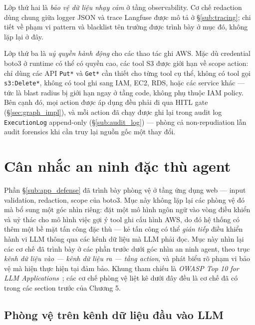 Lớp thứ hai là \emph{bảo vệ dữ liệu nhạy cảm} ở tầng observability. Cơ chế redaction dùng chung giữa logger JSON và trace Langfuse được mô tả ở \S\ref{sub:tracing}; chi tiết về phạm vi pattern và blacklist tên trường được trình bày ở mục đó, không lặp lại ở đây.

Lớp thứ ba là \emph{uỷ quyền hành động} cho các thao tác ghi AWS. Mặc dù credential boto3 ở runtime có thể có quyền cao, các tool S3 được giới hạn về scope action: chỉ dùng các API \texttt{Put*} và \texttt{Get*} cần thiết cho từng tool cụ thể, không có tool gọi \texttt{s3:Delete*}, không có tool ghi sang IAM, EC2, RDS, hoặc các service khác — tức là blast radius bị giới hạn ngay ở tầng code, không phụ thuộc IAM policy. Bên cạnh đó, mọi action được áp dụng đều phải đi qua HITL gate (\S\ref{sec:graph_impl}), và mỗi action đã chạy được ghi lại trong audit log \texttt{ExecutionLog} append-only (\S\ref{sub:audit_log}) — phòng cả non-repudiation lẫn audit forensics khi cần truy lại nguồn gốc một thay đổi.



\section{Cân nhắc an ninh đặc thù agent}
\label{sec:agent_threat_model}

Phần \S\ref{sub:app_defense} đã trình bày phòng vệ ở tầng ứng dụng web --- input validation, redaction, scope của boto3. Mục này không lặp lại các phòng vệ đó mà bổ sung một góc nhìn riêng: \sysname{} đặt một mô hình ngôn ngữ vào vòng điều khiển và uỷ thác cho mô hình việc gợi ý tool ghi cấu hình AWS, do đó hệ thống có thêm một bề mặt tấn công đặc thù --- kẻ tấn công có thể \textit{gián tiếp} điều khiển hành vi LLM thông qua các kênh dữ liệu mà LLM phải đọc. Mục này nhìn lại các cơ chế đã trình bày ở các phần trước dưới góc nhìn an ninh agent, theo trục \emph{kênh dữ liệu vào --- kênh dữ liệu ra --- tầng action}, và phát biểu rõ phạm vi bảo vệ mà hiện thực hiện tại đảm bảo. Khung tham chiếu là \textit{OWASP Top 10 for LLM Applications}~\cite{owasp_llm_top10_2025}; các cơ chế phòng vệ liệt kê dưới đây đều là cơ chế đã có trong các section trước của Chương 5.

\subsection{Phòng vệ trên kênh dữ liệu đầu vào LLM}
\label{sub:agent_input_defense}

